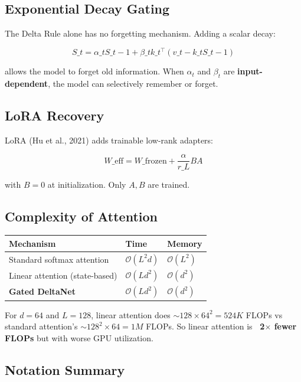 \subsection{Exponential Decay Gating}

The Delta Rule alone has no forgetting mechanism. Adding a scalar decay:

\[
S\_t = \alpha\_t S\_{t-1} + \beta\_t k\_t^\top (v\_t - k\_t S\_{t-1})
\tag{3.4}
\]

allows the model to forget old information. When $\alpha_t$ and $\beta_t$ 
are \textbf{input-dependent}, the model can selectively remember or forget.

\subsection{LoRA Recovery}

LoRA (Hu et al., 2021) adds trainable low-rank adapters:

\[
W\_\text{eff} = W\_\text{frozen} + \frac{\alpha}{r\_L} BA
\tag{3.5}
\]

with $B = 0$ at initialization. Only $A, B$ are trained.

\subsection{Complexity of Attention}

\begin{table}[H]
\centering
\small
\begin{tabular}{lll}
\toprule
\textbf{Mechanism} & \textbf{Time} & \textbf{Memory} \\
\midrule
Standard softmax attention & $\mathcal{O}(L^2 d)$ & $\mathcal{O}(L^2)$ \\
Linear attention (state-based) & $\mathcal{O}(L d^2)$ & $\mathcal{O}(d^2)$ \\
\textbf{Gated DeltaNet} & $\mathcal{O}(L d^2)$ & $\mathcal{O}(d^2)$ \\
\bottomrule
\end{tabular}
\end{table}

For $d = 64$ and $L = 128$, linear attention does $\sim 128 \times 64^2 = 
524K$ FLOPs vs standard attention's $\sim 128^2 \times 64 = 1M$ FLOPs. 
So linear attention is \textbf{~2$\times$ fewer FLOPs} but with worse GPU utilization.

\subsection{Notation Summary}

